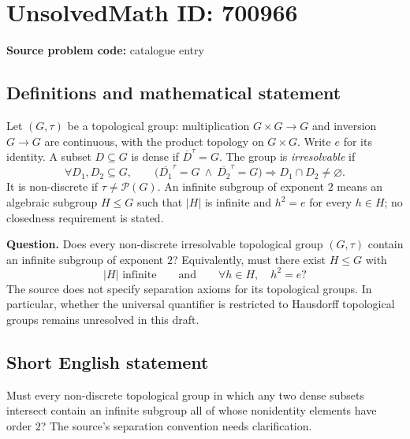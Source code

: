 \documentclass[11pt]{article}
\begin{document}
\section*{UnsolvedMath ID: 700966}
\textbf{Source problem code:} catalogue entry
\subsection{Definitions and mathematical statement}
Let \((G,\tau)\) be a topological group: multiplication \(G\times G\to G\) and inversion \(G\to G\) are continuous, with the product topology on \(G\times G\). Write \(e\) for its identity. A subset \(D\subseteq G\) is dense if \(\overline{D}^{\tau}=G\). The group is \emph{irresolvable} if
\[
\forall D_1,D_2\subseteq G,\qquad
\bigl(\overline{D_1}^{\tau}=G\ \land\ \overline{D_2}^{\tau}=G\bigr)
\Longrightarrow D_1\cap D_2\ne\varnothing.
\]
It is non-discrete if \(\tau\ne\mathcal P(G)\). An infinite subgroup of exponent \(2\) means an algebraic subgroup \(H\le G\) such that \(|H|\) is infinite and \(h^2=e\) for every \(h\in H\); no closedness requirement is stated.

\textbf{Question.} Does every non-discrete irresolvable topological group \((G,\tau)\) contain an infinite subgroup of exponent \(2\)? Equivalently, must there exist \(H\le G\) with
\[
|H|\text{ infinite}
\qquad\text{and}\qquad
\forall h\in H,\quad h^2=e?
\]
The source does not specify separation axioms for its topological groups. In particular, whether the universal quantifier is restricted to Hausdorff topological groups remains unresolved in this draft.
\subsection{Short English statement}
Must every non-discrete topological group in which any two dense subsets intersect contain an infinite subgroup all of whose nonidentity elements have order \(2\)? The source's separation convention needs clarification.
\end{document}

